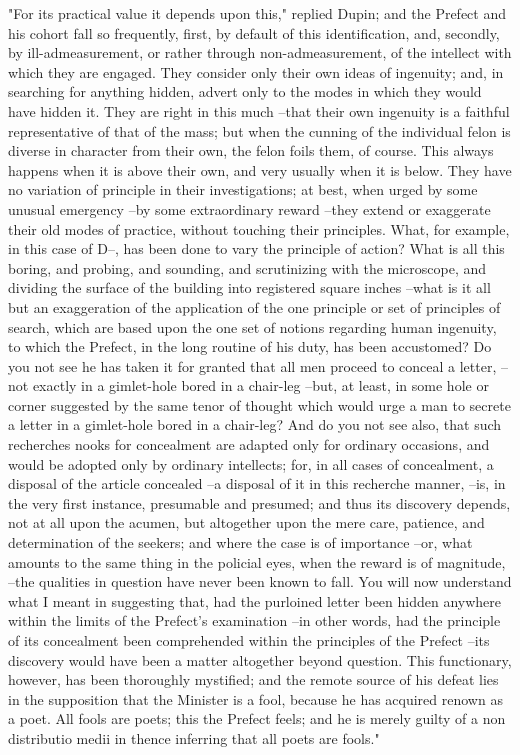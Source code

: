\documentclass{article}
\begin{document}
"For its practical value it depends upon this," replied Dupin; and the Prefect and his cohort fall so frequently, first, by default of this identification, and, secondly, by ill-admeasurement, or rather through non-admeasurement, of the intellect with which they are engaged. They consider only their own ideas of ingenuity; and, in searching for anything hidden, advert only to the modes in which they would have hidden it. They are right in this much --that their own ingenuity is a faithful representative of that of the mass; but when the cunning of the individual felon is diverse in character from their own, the felon foils them, of course. This always happens when it is above their own, and very usually when it is below. They have no variation of principle in their investigations; at best, when urged by some unusual emergency --by some extraordinary reward --they extend or exaggerate their old modes of practice, without touching their principles. What, for example, in this case of D--, has been done to vary the principle of action? What is all this boring, and probing, and sounding, and scrutinizing with the microscope, and dividing the surface of the building into registered square inches --what is it all but an exaggeration of the application of the one principle or set of principles of search, which are based upon the one set of notions regarding human ingenuity, to which the Prefect, in the long routine of his duty, has been accustomed? Do you not see he has taken it for granted that all men proceed to conceal a letter, --not exactly in a gimlet-hole bored in a chair-leg --but, at least, in some hole or corner suggested by the same tenor of thought which would urge a man to secrete a letter in a gimlet-hole bored in a chair-leg? And do you not see also, that such recherches nooks for concealment are adapted only for ordinary occasions, and would be adopted only by ordinary intellects; for, in all cases of concealment, a disposal of the article concealed --a disposal of it in this recherche manner, --is, in the very first instance, presumable and presumed; and thus its discovery depends, not at all upon the acumen, but altogether upon the mere care, patience, and determination of the seekers; and where the case is of importance --or, what amounts to the same thing in the policial eyes, when the reward is of magnitude, --the qualities in question have never been known to fall. You will now understand what I meant in suggesting that, had the purloined letter been hidden anywhere within the limits of the Prefect's examination --in other words, had the principle of its concealment been comprehended within the principles of the Prefect --its discovery would have been a matter altogether beyond question. This functionary, however, has been thoroughly mystified; and the remote source of his defeat lies in the supposition that the Minister is a fool, because he has acquired renown as a poet. All fools are poets; this the Prefect feels; and he is merely guilty of a non distributio medii in thence inferring that all poets are fools."
\end{document}
